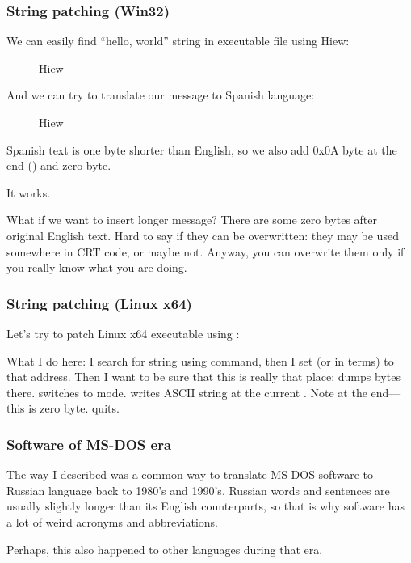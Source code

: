 \subsubsection{String patching (Win32)}

We can easily find ``hello, world'' string in executable file using Hiew:

\begin{figure}[H]
\centering
{}
\caption{Hiew}
\label{}
\end{figure}

And we can try to translate our message to Spanish language:

\begin{figure}[H]
\centering
{}
\caption{Hiew}
\label{}
\end{figure}

Spanish text is one byte shorter than English, so we also add 0x0A byte at the end () and zero byte.

It works.

What if we want to insert longer message?
There are some zero bytes after original English text.
Hard to say if they can be overwritten: they may be used somewhere in \ac{CRT} code, or maybe not.
Anyway, you can overwrite them only if you really know what you are doing.

\subsubsection{String patching (Linux x64)}

\myindex{\radare}
Let's try to patch Linux x64 executable using \radare:



What I do here: I search for  string using \TT{/} command, 
then I set  (or  in \radare terms) to that address.
Then I want to be sure that this is really that place:  dumps bytes there.
 switches \radare to  mode.
 writes ASCII string at the current .
Note  at the end---this is zero byte.
 quits.

\subsubsection{Software  of MS-DOS era}

The way I described was a common way to translate MS-DOS software to Russian language back to 1980's and 1990's.
Russian words and sentences are usually slightly longer than its English counterparts, so that is why 
software has a lot of weird acronyms and abbreviations.

Perhaps, this also happened to other languages during that era.

